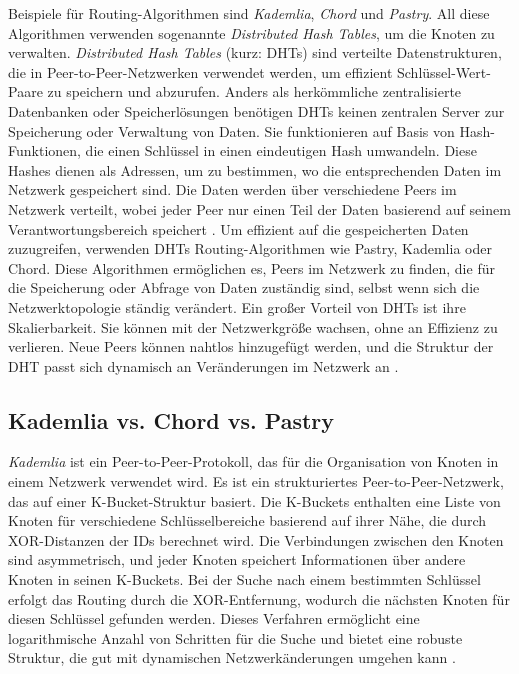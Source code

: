 Beispiele für Routing-Algorithmen sind \textit{Kademlia}, \textit{Chord} und \textit{Pastry}. All diese Algorithmen verwenden sogenannte \textit{Distributed Hash Tables}, um die Knoten zu verwalten. \textit{Distributed Hash Tables} (kurz: DHTs) sind verteilte Datenstrukturen, die in Peer-to-Peer-Netzwerken verwendet werden, um effizient Schlüssel-Wert-Paare zu speichern und abzurufen. Anders als herkömmliche zentralisierte Datenbanken oder Speicherlösungen benötigen DHTs keinen zentralen Server zur Speicherung oder Verwaltung von Daten. Sie funktionieren auf Basis von Hash-Funktionen, die einen Schlüssel in einen eindeutigen Hash umwandeln. Diese Hashes dienen als Adressen, um zu bestimmen, wo die entsprechenden Daten im Netzwerk gespeichert sind. Die Daten werden über verschiedene Peers im Netzwerk verteilt, wobei jeder Peer nur einen Teil der Daten basierend auf seinem Verantwortungsbereich speichert . Um effizient auf die gespeicherten Daten zuzugreifen, verwenden DHTs  Routing-Algorithmen wie Pastry, Kademlia oder Chord. Diese Algorithmen ermöglichen es, Peers im Netzwerk zu finden, die für die Speicherung oder Abfrage von Daten zuständig sind, selbst wenn sich die Netzwerktopologie ständig verändert. Ein großer Vorteil von DHTs ist ihre Skalierbarkeit. Sie können mit der Netzwerkgröße wachsen, ohne an Effizienz zu verlieren. Neue Peers können nahtlos hinzugefügt werden, und die Struktur der DHT passt sich dynamisch an Veränderungen im Netzwerk an \parencite[S. 43-46]{Balakrishnan_LookingUpDataInP2PSystems} \parencite[postnote]{Stoica_Chord,Rowstron_Pastry,Maymounkov_Kademlia}.


\subsection{Kademlia vs. Chord vs. Pastry}

\textit{Kademlia} ist ein Peer-to-Peer-Protokoll, das für die Organisation von Knoten in einem Netzwerk verwendet wird. Es ist ein strukturiertes Peer-to-Peer-Netzwerk, das auf einer K-Bucket-Struktur basiert. Die K-Buckets enthalten eine Liste von Knoten für verschiedene Schlüsselbereiche basierend auf ihrer Nähe, die durch XOR-Distanzen der IDs berechnet wird. Die Verbindungen zwischen den Knoten sind asymmetrisch, und jeder Knoten speichert Informationen über andere Knoten in seinen K-Buckets. Bei der Suche nach einem bestimmten Schlüssel erfolgt das Routing durch die XOR-Entfernung, wodurch die nächsten Knoten für diesen Schlüssel gefunden werden. Dieses Verfahren ermöglicht eine logarithmische Anzahl von Schritten für die Suche und bietet eine robuste Struktur, die gut mit dynamischen Netzwerkänderungen umgehen kann \parencite[S. 1-2]{Maymounkov_Kademlia}.

